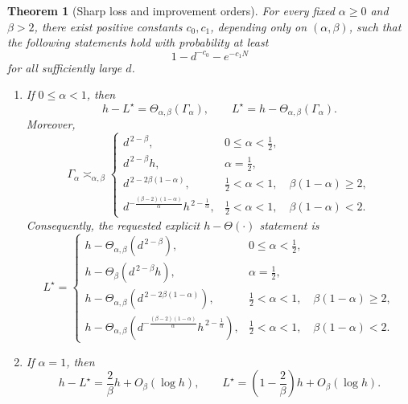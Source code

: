 \documentclass[11pt]{article}
\newtheorem{theorem}{Theorem}[section]
\theoremstyle{remark}
\begin{document}
\begin{theorem}[Sharp loss and improvement orders]
\label{thm:main}
For every fixed \(\alpha\geq0\) and \(\beta>2\), there exist
positive constants \(c_0,c_1\), depending only on
\((\alpha,\beta)\), such that the following statements hold with
probability at least
\[
 1-d^{-c_0}-e^{-c_1N}
\]
for all sufficiently large \(d\).

\begin{enumerate}[label=(\roman*)]
\item If \(0\leq\alpha<1\), then
\begin{equation}
 \boxed{\qquad
 h-L^\star
 =\Theta_{\alpha,\beta}(\Gamma_\alpha),
 \qquad
 L^\star=h-\Theta_{\alpha,\beta}(\Gamma_\alpha).
 \qquad}
 \label{eq:main-subcritical}
\end{equation}
Moreover,
\begin{equation}
 \Gamma_\alpha\asymp_{\alpha,\beta}
 \begin{cases}
 d^{\,2-\beta},
   &0\leq\alpha<\frac12,\\[1mm]
 d^{\,2-\beta}h,
   &\alpha=\frac12,\\[1mm]
 d^{\,2-2\beta(1-\alpha)},
   &\frac12<\alpha<1,\quad\beta(1-\alpha)\geq2,\\[1mm]
 d^{-\frac{(\beta-2)(1-\alpha)}{\alpha}}
 h^{\,2-\frac1\alpha},
   &\frac12<\alpha<1,\quad\beta(1-\alpha)<2.
 \end{cases}
 \label{eq:Gamma-phase}
\end{equation}
Consequently, the requested explicit \(h-\Theta(\cdot)\) statement is
\begin{equation}
 \boxed{
 L^\star=
 \begin{cases}
 h-\Theta_{\alpha,\beta}(d^{\,2-\beta}),
   &0\leq\alpha<\frac12,\\[1mm]
 h-\Theta_{\beta}(d^{\,2-\beta}h),
   &\alpha=\frac12,\\[1mm]
 h-\Theta_{\alpha,\beta}
   (d^{\,2-2\beta(1-\alpha)}),
   &\frac12<\alpha<1,\quad\beta(1-\alpha)\geq2,\\[1mm]
 h-\Theta_{\alpha,\beta}\!\left(
   d^{-\frac{(\beta-2)(1-\alpha)}{\alpha}}
   h^{\,2-\frac1\alpha}\right),
   &\frac12<\alpha<1,\quad\beta(1-\alpha)<2.
 \end{cases}}
 \label{eq:subcritical-explicit}
\end{equation}

\item If \(\alpha=1\), then
\begin{equation}
 \boxed{\qquad
 h-L^\star=\frac2\beta h+O_\beta(\log h),
 \qquad
 L^\star=\left(1-\frac2\beta\right)h+O_\beta(\log h).
 \qquad}
 \label{eq:main-critical}
\end{equation}


\end{enumerate}
\end{theorem}
\end{document}
